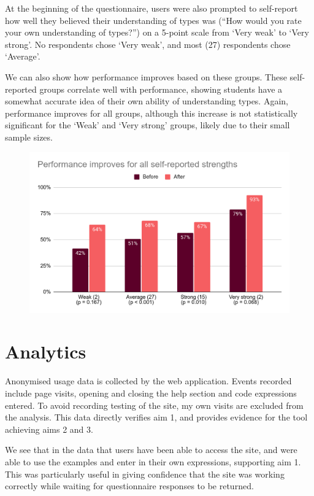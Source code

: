 \documentclass[a4paper,fleqn,twoside,12pt]{report}
\begin{document}
At the beginning of the questionnaire, users were also prompted to self-report how well they believed their understanding of types was (“How would you rate your own understanding of types?”) on a 5-point scale from ‘Very weak’ to ‘Very strong’. No respondents chose ‘Very weak’, and most (27) respondents chose ‘Average’.

We can also show how performance improves based on these groups. These self-reported groups correlate well with performance, showing students have a somewhat accurate idea of their own ability of understanding types. Again, performance improves for all groups, although this increase is not statistically significant for the ‘Weak’ and ‘Very strong’ groups, likely due to their small sample sizes.

{\centering \begin{figure}[h!]
  \centering
  \includegraphics[width=0.884\linewidth]{images/image27.png}
  \label{figure:Chart}
\end{figure} \par}
\section{Analytics}\label{id:h.67g05flyfv0z}
Anonymised usage data is collected by the web application. Events recorded include page visits, opening and closing the help section and code expressions entered. To avoid recording testing of the site, my own visits are excluded from the analysis. This data directly verifies aim 1, and provides evidence for the tool achieving aims 2 and 3.

We see that in the data that users have been able to access the site, and were able to use the examples and enter in their own expressions, supporting aim 1. This was particularly useful in giving confidence that the site was working correctly while waiting for questionnaire responses to be returned.
\end{document}
